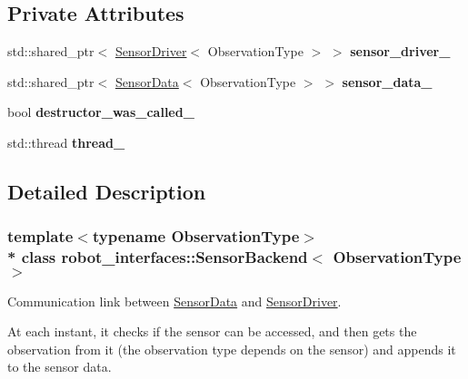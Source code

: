 \subsection*{Private Attributes}
\begin{DoxyCompactItemize}
\item 
std\+::shared\+\_\+ptr$<$ \hyperlink{classrobot__interfaces_1_1SensorDriver}{Sensor\+Driver}$<$ Observation\+Type $>$ $>$ {\bfseries sensor\+\_\+driver\+\_\+}\hypertarget{classrobot__interfaces_1_1SensorBackend_a72fda090e697edcda5f92d7542788171}{}\label{classrobot__interfaces_1_1SensorBackend_a72fda090e697edcda5f92d7542788171}

\item 
std\+::shared\+\_\+ptr$<$ \hyperlink{classrobot__interfaces_1_1SensorData}{Sensor\+Data}$<$ Observation\+Type $>$ $>$ {\bfseries sensor\+\_\+data\+\_\+}\hypertarget{classrobot__interfaces_1_1SensorBackend_a93c993a56270f282235df08337e0bc26}{}\label{classrobot__interfaces_1_1SensorBackend_a93c993a56270f282235df08337e0bc26}

\item 
bool {\bfseries destructor\+\_\+was\+\_\+called\+\_\+}\hypertarget{classrobot__interfaces_1_1SensorBackend_a479d96dc0a9fce6c72c7957e005530f7}{}\label{classrobot__interfaces_1_1SensorBackend_a479d96dc0a9fce6c72c7957e005530f7}

\item 
std\+::thread {\bfseries thread\+\_\+}\hypertarget{classrobot__interfaces_1_1SensorBackend_ac9ca3c3602264de39a6bca792b51dcd4}{}\label{classrobot__interfaces_1_1SensorBackend_ac9ca3c3602264de39a6bca792b51dcd4}

\end{DoxyCompactItemize}


\subsection{Detailed Description}
\subsubsection*{template$<$typename Observation\+Type$>$\\*
class robot\+\_\+interfaces\+::\+Sensor\+Backend$<$ Observation\+Type $>$}

Communication link between \hyperlink{classrobot__interfaces_1_1SensorData}{Sensor\+Data} and \hyperlink{classrobot__interfaces_1_1SensorDriver}{Sensor\+Driver}. 

At each instant, it checks if the sensor can be accessed, and then gets the observation from it (the observation type depends on the sensor) and appends it to the sensor data.


